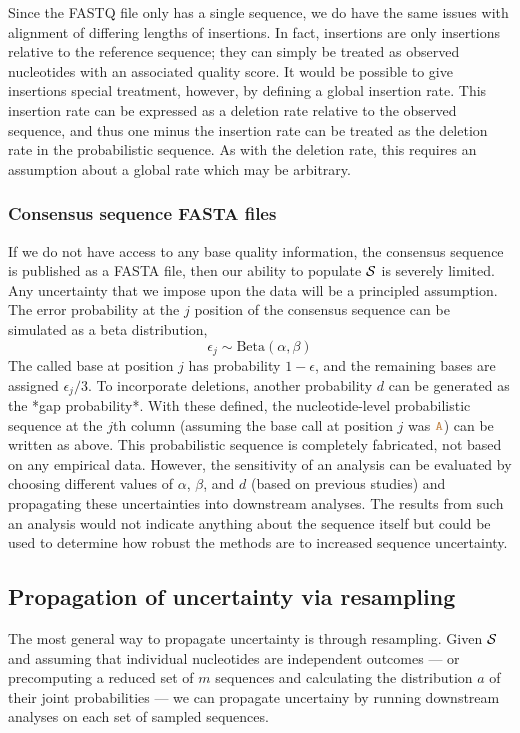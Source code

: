 \documentclass[10pt]{article}
\begin{document}
Since the FASTQ file only has a single sequence, we do have the same issues with alignment of differing lengths of insertions.
In fact, insertions are only insertions relative to the reference sequence; they can simply be treated as observed nucleotides with an associated quality score.
It would be possible to give insertions special treatment, however, by defining a global insertion rate.
This insertion rate can be expressed as a deletion rate relative to the observed sequence, and thus one minus the insertion rate can be treated as the deletion rate in the probabilistic sequence.
As with the deletion rate, this requires an assumption about a global rate which may be arbitrary.


\subsubsection{Consensus sequence FASTA files}


If we do not have access to any base quality information, \eg the consensus sequence is published as a FASTA file, then our ability to populate $\mathcal{S}$ is severely limited.
Any uncertainty that we impose upon the data will be a principled assumption.
The error probability at the $j$ position of the consensus sequence can be simulated as a beta distribution, \ie 
$$
\epsilon_j \sim\text{Beta}(\alpha, \beta)
$$
The called base at position $j$ has probability $1-\epsilon$, and the remaining bases are assigned $\epsilon_j/3$.
To incorporate deletions, another probability $d$ can be generated as the *gap probability*.
With these defined, the nucleotide-level probabilistic sequence at the $j$th column (assuming the base call at position $j$ was $\texttt{\textcolor{brown}{A}}$) can be written as above.
This probabilistic sequence is completely fabricated, \ie not based on any empirical data.
However, the sensitivity of an analysis can be evaluated by choosing different values of $\alpha$, $\beta$, and $d$ (\eg based on previous studies) and propagating these uncertainties into downstream analyses.
The results from such an analysis would not indicate anything about the sequence itself but could be used to determine how robust the methods are to increased sequence uncertainty.


\subsection{Propagation of uncertainty via resampling}

The most general way to propagate uncertainty is through resampling.
Given $\mathcal{S}$ and assuming that individual nucleotides are independent outcomes --- or precomputing a reduced set of $m$ sequences and calculating the distribution $a$ of their joint probabilities --- we can propagate uncertainy by running downstream analyses on each set of sampled sequences.
\end{document}
